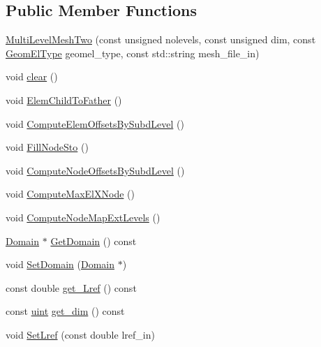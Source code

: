 \subsection*{Public Member Functions}
\begin{DoxyCompactItemize}
\item 
\mbox{\hyperlink{classfemus_1_1_multi_level_mesh_two_aa6f3b2f33e877654cbe2deec4bcc783b}{Multi\+Level\+Mesh\+Two}} (const unsigned nolevels, const unsigned dim, const \mbox{\hyperlink{_geom_el_type_enum_8hpp_a5f4d1ffd8f6d0e4930c05074e733031d}{Geom\+El\+Type}} geomel\+\_\+type, const std\+::string mesh\+\_\+file\+\_\+in)
\item 
void \mbox{\hyperlink{classfemus_1_1_multi_level_mesh_two_a0957e12f70519d5a208c4dcb64ab1479}{clear}} ()
\item 
void \mbox{\hyperlink{classfemus_1_1_multi_level_mesh_two_ab40ccf25155da82eba08e5c328c2340e}{Elem\+Child\+To\+Father}} ()
\item 
void \mbox{\hyperlink{classfemus_1_1_multi_level_mesh_two_aa6ccebf256b74843676735f05f4a2521}{Compute\+Elem\+Offsets\+By\+Subd\+Level}} ()
\item 
void \mbox{\hyperlink{classfemus_1_1_multi_level_mesh_two_a6ad5acbba0b96c59cb48d77cbb8f3827}{Fill\+Node\+Sto}} ()
\item 
void \mbox{\hyperlink{classfemus_1_1_multi_level_mesh_two_a82ef73f3ce811a7475a8e92f827ce17a}{Compute\+Node\+Offsets\+By\+Subd\+Level}} ()
\item 
void \mbox{\hyperlink{classfemus_1_1_multi_level_mesh_two_a0bbe7e9cca35f2cb2f93cbb50718ee76}{Compute\+Max\+El\+X\+Node}} ()
\item 
void \mbox{\hyperlink{classfemus_1_1_multi_level_mesh_two_a6c4b8b1cd5e1d30f315d5fbab4e472eb}{Compute\+Node\+Map\+Ext\+Levels}} ()
\item 
\mbox{\hyperlink{classfemus_1_1_domain}{Domain}} $\ast$ \mbox{\hyperlink{classfemus_1_1_multi_level_mesh_two_ab9d25c5c55f650ac17469b863a7586d1}{Get\+Domain}} () const
\item 
void \mbox{\hyperlink{classfemus_1_1_multi_level_mesh_two_a256cc90a75f655f95e94dbce46177b31}{Set\+Domain}} (\mbox{\hyperlink{classfemus_1_1_domain}{Domain}} $\ast$)
\item 
const double \mbox{\hyperlink{classfemus_1_1_multi_level_mesh_two_ac2b345f7a5f8b3c59436f037ede4c6b1}{get\+\_\+\+Lref}} () const
\item 
const \mbox{\hyperlink{_typedefs_8hpp_a91ad9478d81a7aaf2593e8d9c3d06a14}{uint}} \mbox{\hyperlink{classfemus_1_1_multi_level_mesh_two_a767181491d990e3b808571309b153eb9}{get\+\_\+dim}} () const
\item 
void \mbox{\hyperlink{classfemus_1_1_multi_level_mesh_two_a1c89c8df632231b116f5113f79dcf008}{Set\+Lref}} (const double lref\+\_\+in)
\end{DoxyCompactItemize}
